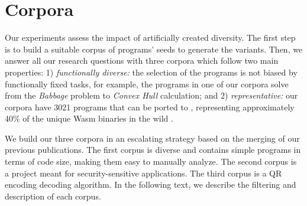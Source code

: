 

\section{Corpora}
\label{section:crow:corpora}

Our experiments assess the impact of artificially created diversity. The first step is to build a suitable corpus of programs' seeds to generate the variants. Then, we answer all our research questions with three corpora which follow two main properties: 1) \emph{functionally diverse:} the selection of the programs is not biased by functionally fixed tasks, for example, the programs in one of our corpora solve from the \textit{Babbage} problem to \textit{Convex Hull} calculation; and 2) \emph{representative:} our corpora have 3021 programs that can be ported to \wasm, representing approximately 40\% of the unique Wasm binaries in the wild \cite{Hilbig2021AnES}.


We build our three corpora in an escalating strategy based on the merging of our previous publications. The first corpus is diverse and contains simple programs in terms of code size, making them easy to manually analyze. The second corpus is a project meant for security-sensitive applications. The third corpus is a QR encoding decoding algorithm. 
In the following text, we describe the filtering and description of each corpus.

